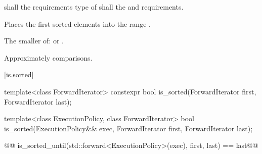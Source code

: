 \begin{itemdescr}
\pnum
\requires
{}
 shall  the
 requirements  type of  shall
 the
 and
 requirements.

\pnum
\effects
Places the first
sorted elements into the range
.

\pnum
\returns
The smaller of:
 or
.

\pnum
\complexity
Approximately
comparisons.
\end{itemdescr}


[is.sorted]{}

%
\begin{itemdecl}
template<class ForwardIterator>
  constexpr bool is_sorted(ForwardIterator first, ForwardIterator last);
\end{itemdecl}

\begin{itemdescr}
\pnum
\oldoldtxt{\returns} 
\end{itemdescr}

%
\begin{itemdecl}
template<class ExecutionPolicy, class ForwardIterator>
  bool is_sorted(ExecutionPolicy&& exec,
                 ForwardIterator first, ForwardIterator last);
\end{itemdecl}

\begin{itemdescr}
\pnum
\oldoldtxt{\returns}
\begin{codeblock}
@@ is_sorted_until(std::forward<ExecutionPolicy>(exec), first, last) == last@\newnewtxt{;}@
\end{codeblock}
\end{itemdescr}

